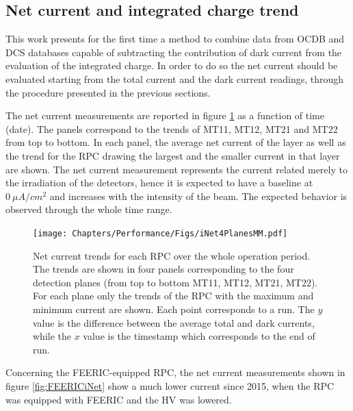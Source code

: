 \subsection{Net current and integrated charge trend}
This work presents for the first time a method to combine data from OCDB and DCS databases capable of subtracting the contribution of dark current from the evaluation of the integrated charge.
In order to do so the net current should be evaluated starting from the total current and the dark current readings, through the procedure presented in the previous sections.

The net current measurements are reported in figure \ref{fig:iNet4Planes} as a function of time (date).
The panels correspond to the trends of MT11, MT12, MT21 and MT22 from top to bottom.
In each panel, the average net current of the layer as well as the trend for the RPC drawing the largest and the smaller current in that layer are shown.
The net current measurement represents the current related merely to the irradiation of the detectors, hence it is expected to have a baseline at $0\ \mu A/cm^2$ and increases with the intensity of the beam.
The expected behavior is observed through the whole time range.

\begin{figure}[!t]
\begin{center}
\texttt{[image: Chapters/Performance/Figs/iNet4PlanesMM.pdf]}
\caption{Net current trends for each RPC over the whole operation period. The trends are shown in four panels corresponding to the four detection planes (from top to bottom MT11, MT12, MT21, MT22). For each plane only the trends of the RPC with the maximum and minimum current are shown. Each point corresponds to a run. The $y$ value is the difference between the average total and dark currents, while the $x$ value is the timestamp which corresponds to the end of run.}
\label{fig:iNet4Planes}
\end{center}
\end{figure}

Concerning the FEERIC-equipped RPC, the net current measurements shown in figure \ref{fig:FEERICiNet} show a much lower current since 2015, when the RPC was equipped with FEERIC and the HV was lowered.

